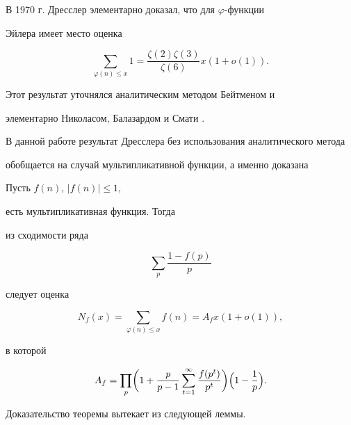  


\maketitle 


 


 


В 1970 г. Дресслер элементарно доказал, что для $\varphi$-функции 


Эйлера имеет место оценка 


$$ 


\sum_{\varphi(n)\le x}1=\frac{\zeta(2)\zeta(3)}{\zeta(6)}x(1+o(1)). 


$$ 


Этот результат уточнялся аналитическим методом Бейтменом и 


элементарно Николасом, Балазардом и Смати \cite{Bal}. 


В данной работе результат Дресслера без использования аналитического метода 


обобщается на случай мультипликативной функции, а именно доказана 


 


\begin{thmnonum} Пусть $f(n)$, $|f(n)|\le 1$,


есть мультипликативная функция. Тогда 


из сходимости ряда 


$$ 


\sum_p \frac{1-f(p)}{p} 


$$ 


следует оценка 


$$ 


N_f(x)=\sum_{\varphi(n)\le x}f(n)=A_f x(1+o(1)), 


$$ 


в которой 


$$ 


A_f=\prod_p\biggl(1+\frac{p}{p-1}\sum^\infty_{t=1} 


\frac{f(p^t)}{p^t}\biggr)\Bigl(1-\frac{1}{p}\Bigr). 


$$ 


\end{thmnonum} 


 


Доказательство теоремы вытекает из следующей леммы. 


